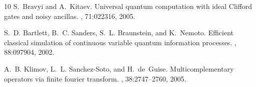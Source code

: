 \documentclass[aps,twocolumn,showpacs,nofootinbib,superscriptaddress]{revtex4}
\begin{document}
\begin{thebibliography}{10}
S.~Bravyi and A.~Kitaev.
\newblock Universal quantum computation with ideal {C}lifford gates and noisy
  ancillas.
, 71:022316, 2005.

S.~D. Bartlett, B.~C. Sanders, S.~L. Braunstein, and K.~Nemoto.
\newblock Efficient classical simulation of continuous variable quantum
  information processes.
, 88:097904, 2002.

A.~B. Klimov, L.~L. Sanchez-Soto, and H.~de~Guise.
\newblock Multicomplementary operators via finite fourier transform.
, 38:2747--2760, 2005.

\end{thebibliography}
\end{document}
